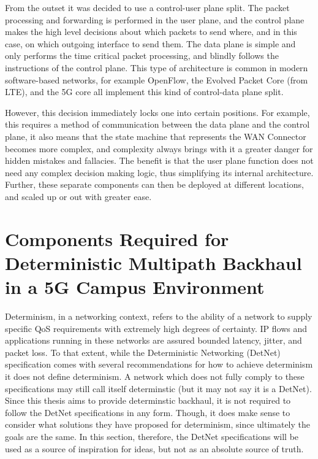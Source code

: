From the outset it was decided to use a control-user plane split. The packet processing and forwarding is performed in the user plane, and the control plane makes the high level decisions about which packets to send where, and in this case, on which outgoing interface to send them. The data plane is simple and only performs the time critical packet processing, and blindly follows the instructions of the control plane. This type of architecture is common in modern software-based networks, for example OpenFlow, the Evolved Packet Core (from LTE), and the 5G core all implement this kind of control-data plane split.

However, this decision immediately locks one into certain positions. For example, this requires a method of communication between the data plane and the control plane, it also means that the state machine that represents the WAN Connector becomes more complex, and complexity always brings with it a greater danger for hidden mistakes and fallacies. The benefit is that the user plane function does not need any complex decision making logic, thus simplifying its internal architecture. Further, these separate components can then be deployed at different locations, and scaled up or out with greater ease.

\section{Components Required for Deterministic Multipath Backhaul in a 5G Campus Environment}
\label{sec:approach:comp}

Determinism, in a networking context, refers to the ability of a network to supply specific QoS requirements with extremely high degrees of certainty. IP flows and applications running in these networks are assured bounded latency, jitter, and packet loss. To that extent, while the Deterministic Networking (DetNet) specification comes with several recommendations for how to achieve determinism it does not define determinism. A network which does not fully comply to these specifications may still call itself determinstic (but it may not say it is a DetNet). Since this thesis aims to provide determinstic backhaul, it is not required to follow the DetNet specifications in any form. Though, it does make sense to consider what solutions they have proposed for determinism, since ultimately the goals are the same. In this section, therefore, the DetNet specifications will be used as a source of inspiration for ideas, but not as an absolute source of truth.

